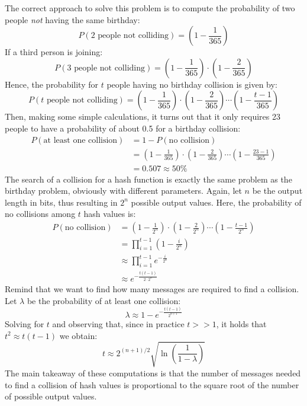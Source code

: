 \bigskip
\noindent
The correct approach to solve this problem is to compute the probability of two people \textit{not} having the same birthday:
$$P(\text{2 people not colliding}) = \left(1-\frac{1}{365} \right)$$
If a third person is joining:
$$P(\text{3 people not colliding}) = \left(1-\frac{1}{365} \right) \cdot \left(1-\frac{2}{365} \right)$$
Hence, the probability for $t$ people having no birthday collision is given by:
$$P(\text{$t$ people not colliding}) = \left(1-\frac{1}{365} \right) \cdot \left(1-\frac{2}{365} \right) \dotsm \left(1-\frac{t-1}{365} \right)$$
Then, making some simple calculations, it turns out that it only requires 23 people to have a probability of about 0.5 for a birthday collision:
\begin{equation*}
\begin{split}
    P(\text{at least one collision}) &= 1 - P(\text{no collision}) \\
            &= \left(1-\frac{1}{365} \right) \cdot \left(1-\frac{2}{365} \right) \dotsm \left(1-\frac{23-1}{365} \right) \\
            &= 0.507 \approx 50 \%
\end{split}
\end{equation*}
The search of a collision for a hash function is exactly the same problem as the birthday problem, obviously with different parameters. Again, let $n$ be the output length in bits, thus resulting in $2^{n}$ possible output values. Here, the probability of no collisions among $t$ hash values is:
\begin{equation*}
\begin{split}
    P(\text{no collision}) &= \left(1-\frac{1}{2^{n}} \right) \cdot \left(1-\frac{2}{2^{n}} \right) \dotsm \left(1-\frac{t-1}{2^{n}} \right) \\
            &= \prod\limits_{i=1}^{t-1} \left(1-\frac{i}{2^{n}} \right) \\
            &\approx \prod\limits_{i=1}^{t-1} e^{- \frac{i}{2^{n}}} \\
            &\approx e^{- \frac{t(t-1)}{2\cdot 2^{n}}}
\end{split}
\end{equation*}
Remind that we want to find how many messages are required to find a collision. Let $\lambda$ be the probability of at least one collision:
$$\lambda \approx 1 - e^{- \frac{t(t-1)}{2^{n+1}}}$$
Solving for $t$ and observing that, since in practice $t>>1$, it holds that $t^{2}\approx t(t-1)$ we obtain:
$$t\approx 2^{(n+1)/2} \sqrt{\ln{\left(\frac{1}{1-\lambda}\right)}}$$
The main takeaway of these computations is that the number of messages needed to find a collision of hash values is proportional to the square root of the number of possible output values.

